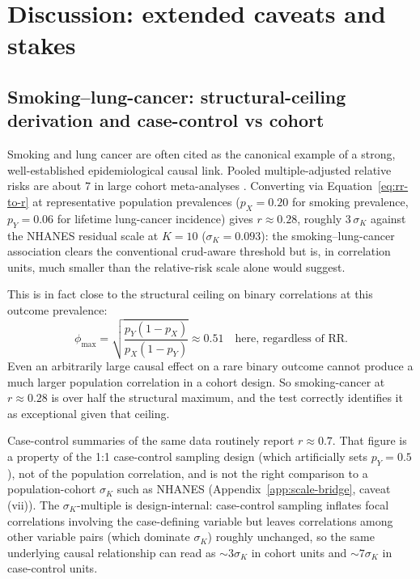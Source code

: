 \section{Discussion: extended caveats and stakes}
\label{si:discussion-extras}

\subsection{Smoking--lung-cancer: structural-ceiling derivation and case-control vs cohort}
\label{si:smoking-detail}

Smoking and lung cancer are often cited as the canonical example of a strong, well-established epidemiological causal link. Pooled multiple-adjusted relative risks are about 7 in large cohort meta-analyses \citep{okeeffe2018}. Converting via Equation~\eqref{eq:rr-to-r} at representative population prevalences ($p_X=0.20$ for smoking prevalence, $p_Y=0.06$ for lifetime lung-cancer incidence) gives $r\approx 0.28$, roughly $3\,\sigma_K$ against the NHANES residual scale at $K=10$ ($\sigma_K=0.093$): the smoking--lung-cancer association clears the conventional crud-aware threshold but is, in correlation units, much smaller than the relative-risk scale alone would suggest.

This is in fact close to the structural ceiling on binary correlations at this outcome prevalence:
\begin{equation}
\phi_{\max} = \sqrt{\frac{p_Y(1-p_X)}{p_X(1-p_Y)}} \approx 0.51 \quad \text{here, regardless of RR.}
\end{equation}
Even an arbitrarily large causal effect on a rare binary outcome cannot produce a much larger population correlation in a cohort design. So smoking-cancer at $r\approx 0.28$ is over half the structural maximum, and the test correctly identifies it as exceptional given that ceiling.

Case-control summaries of the same data routinely report $r\approx 0.7$. That figure is a property of the 1:1 case-control sampling design (which artificially sets $p_Y=0.5$), not of the population correlation, and is not the right comparison to a population-cohort $\sigma_K$ such as NHANES (Appendix~\ref{app:scale-bridge}, caveat (vii)). The $\sigma_K$-multiple is design-internal: case-control sampling inflates focal correlations involving the case-defining variable but leaves correlations among other variable pairs (which dominate $\sigma_K$) roughly unchanged, so the same underlying causal relationship can read as $\sim 3\sigma_K$ in cohort units and $\sim 7\sigma_K$ in case-control units.

